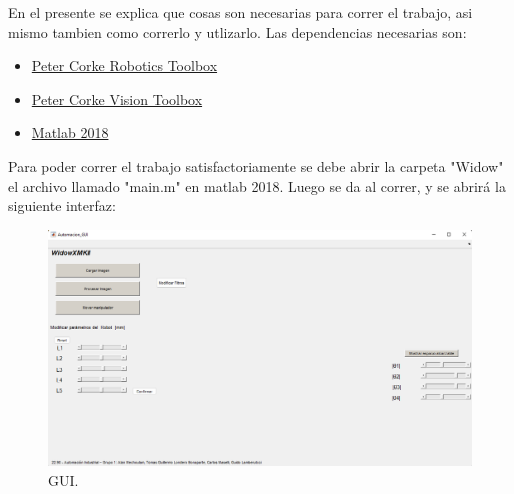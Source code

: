 



\def\verObs{0}


\setmainfont{AvenirLTStd-Roman}



\setmainfont{Calibri}




En el presente se explica que cosas son necesarias para correr el trabajo, asi mismo tambien como correrlo y utlizarlo.
Las dependencias necesarias son:
\begin{itemize}
\item \href{https://petercorke.com/toolboxes/robotics-toolbox/}{Peter Corke Robotics Toolbox}
\item \href{https://petercorke.com/toolboxes/machine-vision-toolbox/}{Peter Corke Vision Toolbox}
\item \href{https://la.mathworks.com/products/matlab.html}{Matlab 2018}
\end{itemize}
Para poder correr el trabajo satisfactoriamente se debe abrir la carpeta "Widow" el archivo llamado "main.m" en matlab 2018.
Luego se da al correr, y se abrirá la siguiente interfaz:
\begin{figure}[H]
	\centering
	\includegraphics[width=0.8\linewidth]{GUI}
	\caption{GUI.}	
	\label{fig:GUI}
\end{figure}
